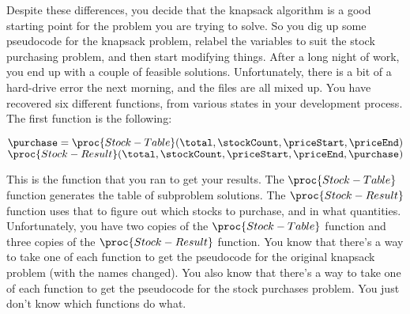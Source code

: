 \documentclass[12pt,twoside]{article}
\newcommand{\answerIIh}{\solution{
5
}}
\begin{document}
\begin{problems}
\begin{problemparts}
\begin{enumerate}
\end{enumerate}
\answerIIh

\end{problemparts}

Despite these differences,
you decide that the knapsack algorithm
is a good starting point
for the problem you are trying to solve.
So you dig up some pseudocode for the knapsack problem,
relabel the variables to suit the stock purchasing problem,
and then start modifying things.
After a long night of work,
you end up with a couple of feasible solutions.
Unfortunately,
there is a bit of a hard-drive error the next morning,
and the files are all mixed up.
You have recovered six different functions,
from various states in your development process.
The first function is the following:

\begin{codebox}
\li $\purchase = \proc{Stock-Table}
		(\total, \stockCount, \priceStart, \priceEnd)$
\li \Return $\proc{Stock-Result}
		(\total, \stockCount, \priceStart, \priceEnd, \purchase)$
\end{codebox}

This is the function that you ran to get your results.
The $\proc{Stock-Table}$ function
generates the table of subproblem solutions.
The $\proc{Stock-Result}$ function
uses that to figure out which stocks to purchase,
and in what quantities.
Unfortunately,
you have two copies of the $\proc{Stock-Table}$ function
and three copies of the $\proc{Stock-Result}$ function.
You know that there's a way to take one of each function
to get the pseudocode for the original knapsack problem
(with the names changed).
You also know that there's a way to take one of each function
to get the pseudocode for the stock purchases problem.
You just don't know which functions do what.


\end{problems}
\end{document}
